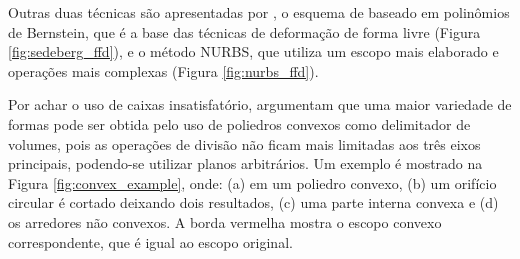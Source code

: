 Outras duas técnicas são apresentadas por , o esquema de  baseado em polinômios de Bernstein, que é a base das técnicas de deformação de forma livre (Figura \ref{fig:sedeberg_ffd}), e o método \gls{NURBS}, que utiliza um escopo mais elaborado e operações mais complexas (Figura \ref{fig:nurbs_ffd}).

\begin{figure}[h!]
	\centering
	\captionsetup{width=15cm}
	{}	
\end{figure}

\begin{figure}[h!]
	\centering
	\captionsetup{width=15cm}
	{}	
\end{figure}

Por achar o uso de caixas insatisfatório,  argumentam que uma maior variedade de formas pode ser obtida pelo uso de poliedros convexos como delimitador de volumes, pois as operações de divisão não ficam mais limitadas aos três eixos principais, podendo-se utilizar planos arbitrários. Um exemplo é mostrado na Figura \ref{fig:convex_example}, onde: (a) em um poliedro convexo, (b) um orifício circular é cortado deixando dois resultados, (c) uma parte interna convexa e (d) os arredores não convexos. A borda vermelha mostra o escopo convexo correspondente, que é igual ao escopo original.

